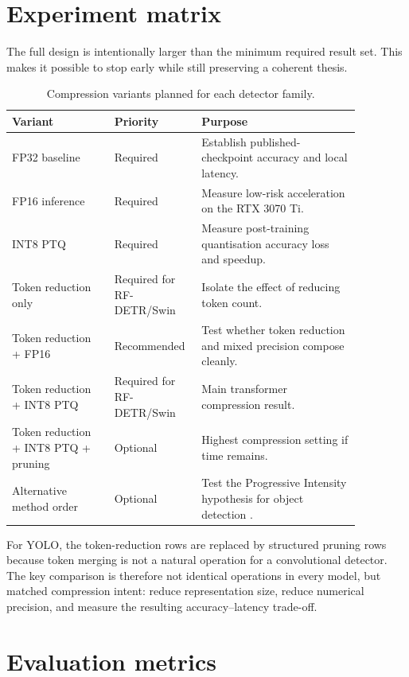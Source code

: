 \documentclass[a4paper,11pt,twoside]{report}
\theoremstyle{definition}
\begin{document}
\section{Experiment matrix}

The full design is intentionally larger than the minimum required result set. This makes it possible to stop early while still preserving a coherent thesis.

\begin{table}[H]
\centering
\small
\begin{tabular}{p{0.27\linewidth} p{0.18\linewidth} p{0.42\linewidth}}
\hline
Variant & Priority & Purpose \\
\hline
FP32 baseline & Required & Establish published-checkpoint accuracy and local latency. \\
FP16 inference & Required & Measure low-risk acceleration on the RTX 3070 Ti. \\
INT8 PTQ & Required & Measure post-training quantisation accuracy loss and speedup. \\
Token reduction only & Required for RF-DETR/Swin & Isolate the effect of reducing token count. \\
Token reduction + FP16 & Recommended & Test whether token reduction and mixed precision compose cleanly. \\
Token reduction + INT8 PTQ & Required for RF-DETR/Swin & Main transformer compression result. \\
Token reduction + INT8 PTQ + pruning & Optional & Highest compression setting if time remains. \\
Alternative method order & Optional & Test the Progressive Intensity hypothesis for object detection \cite{Kim2026CompressionOrder}. \\
\hline
\end{tabular}
\caption{Compression variants planned for each detector family.}
\label{tab:experiment_matrix}
\end{table}

For YOLO, the token-reduction rows are replaced by structured pruning rows because token merging is not a natural operation for a convolutional detector. The key comparison is therefore not identical operations in every model, but matched compression intent: reduce representation size, reduce numerical precision, and measure the resulting accuracy--latency trade-off.

\section{Evaluation metrics}
\end{document}
